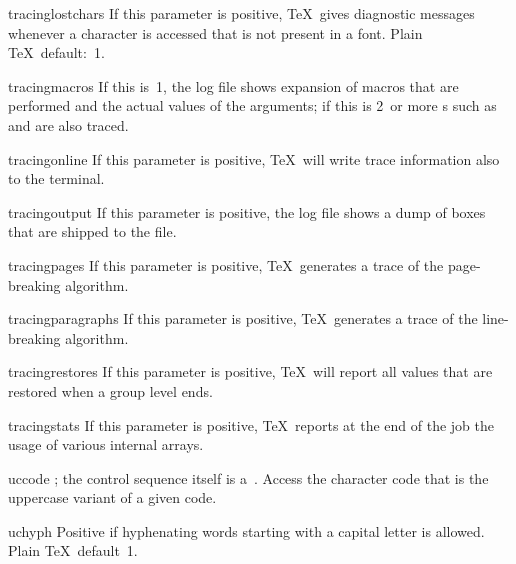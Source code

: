 \item tracinglostchars
      If this parameter is positive, \TeX\ gives      
      diagnostic messages whenever a character is accessed that      
      is not present in a font. Plain \TeX\ default:~1.

\item tracingmacros
      If this is~1, the log file shows expansion of macros 
      that are performed and the actual values of the arguments; 
      if this is 2~or more
      s such as 
       and  are also traced.

\item tracingonline
      If this parameter is positive, \TeX\ will write trace      
      information also to the terminal.

\item tracingoutput
      If this parameter is positive, the log file shows a dump of boxes 
      that are shipped to the  file.

\item tracingpages
      If this parameter is positive, \TeX\ generates      
      a trace of the page-breaking algorithm.

\item tracingparagraphs
      If this parameter is positive, \TeX\ generates      
      a trace of the line-breaking algorithm.

\item tracingrestores
      If this parameter is positive, \TeX\ will report      
      all values that are restored when a group level ends.

\item tracingstats
      If this parameter is positive, \TeX\ reports at the      
      end of the job the usage of various internal arrays.

\item uccode
      ; the control sequence itself
      is a~.
      Access
      the character code that is the uppercase variant of a given code.

\item uchyph
      Positive if hyphenating words starting with a capital 
      letter is allowed. 
      Plain \TeX\ default~1.

